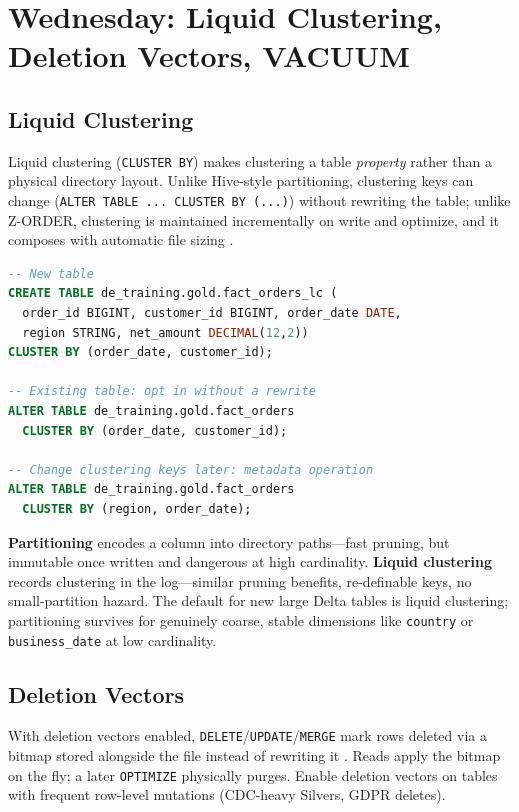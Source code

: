 \section{Wednesday: Liquid Clustering, Deletion Vectors, VACUUM}
\subsection{Liquid Clustering}
Liquid clustering (\texttt{CLUSTER BY}) makes clustering a table \emph{property} rather than a physical directory layout. Unlike Hive-style partitioning, clustering keys can change (\texttt{ALTER TABLE ... CLUSTER BY (...)}) without rewriting the table; unlike Z-ORDER, clustering is maintained incrementally on write and optimize, and it composes with automatic file sizing \cite{databricksLiquidClustering}.

\begin{lstlisting}[language=SQL,caption={Liquid clustering: creation, change, and the partition migration.},label={lst:ch5-liquid}]
-- New table
CREATE TABLE de_training.gold.fact_orders_lc (
  order_id BIGINT, customer_id BIGINT, order_date DATE,
  region STRING, net_amount DECIMAL(12,2))
CLUSTER BY (order_date, customer_id);

-- Existing table: opt in without a rewrite
ALTER TABLE de_training.gold.fact_orders
  CLUSTER BY (order_date, customer_id);

-- Change clustering keys later: metadata operation
ALTER TABLE de_training.gold.fact_orders
  CLUSTER BY (region, order_date);
\end{lstlisting}

\begin{definitionbox}
\textbf{Partitioning} encodes a column into directory paths---fast pruning, but immutable once written and dangerous at high cardinality. \textbf{Liquid clustering} records clustering in the log---similar pruning benefits, re-definable keys, no small-partition hazard. The default for new large Delta tables is liquid clustering; partitioning survives for genuinely coarse, stable dimensions like \texttt{country} or \texttt{business\_date} at low cardinality.
\end{definitionbox}

\subsection{Deletion Vectors}
With deletion vectors enabled, \texttt{DELETE}/\texttt{UPDATE}/\texttt{MERGE} mark rows deleted via a bitmap stored alongside the file instead of rewriting it \cite{databricksDeletionVectors}. Reads apply the bitmap on the fly; a later \texttt{OPTIMIZE} physically purges. Enable deletion vectors on tables with frequent row-level mutations (CDC-heavy Silvers, GDPR deletes).

